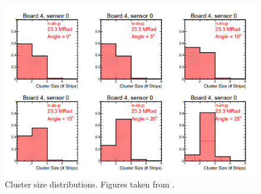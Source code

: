 \begin{figure}
\centering
\includegraphics{figures/Cluster_size.PNG}
\caption{Cluster size distributions. Figures taken from \cite{tb1}. 
}\label{fig:clusters_size}
\end{figure}

 